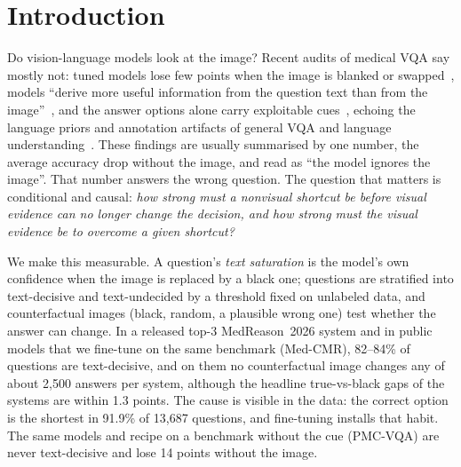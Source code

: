 \section{Introduction}
\label{sec:intro}

Do vision-language models look at the image?
Recent audits of medical VQA say mostly not: tuned models lose few points when the image is blanked or swapped~\cite{zafar2026coral}, models ``derive more useful information from the question text than from the image''~\cite{pokrywka2026polish}, and the answer options alone carry exploitable cues~\cite{wang2026medqamm}, echoing the language priors and annotation artifacts of general VQA and language understanding~\cite{goyal2017making,agrawal2018dont,si2022language,gururangan2018annotation,poliak2018hypothesis}.
These findings are usually summarised by one number, the average accuracy drop without the image, and read as ``the model ignores the image''.
That number answers the wrong question.
The question that matters is conditional and causal: \emph{how strong must a nonvisual shortcut be before visual evidence can no longer change the decision, and how strong must the visual evidence be to overcome a given shortcut?}

We make this measurable.
A question's \emph{text saturation} is the model's own confidence when the image is replaced by a black one; questions are stratified into text-decisive and text-undecided by a threshold fixed on unlabeled data, and counterfactual images (black, random, a plausible wrong one) test whether the answer can change.
In a released top-3 MedReason~2026 system and in public models that we fine-tune on the same benchmark (Med-CMR), 82--84\% of questions are text-decisive, and on them no counterfactual image changes any of about 2{,}500 answers per system, although the headline true-vs-black gaps of the systems are within 1.3 points.
The cause is visible in the data: the correct option is the shortest in 91.9\% of 13{,}687 questions, and fine-tuning installs that habit.
The same models and recipe on a benchmark without the cue (PMC-VQA) are never text-decisive and lose 14 points without the image.

